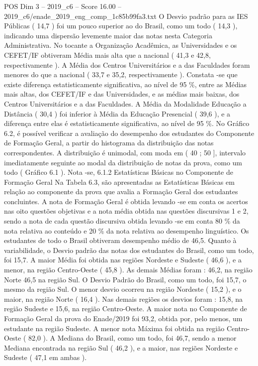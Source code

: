 \begin{textsample}{POS Dim 3 – 2019\_c6 – Score 16.00 – 2019\_c6/enade\_2019\_eng\_comp\_1c85b99fa3.txt}
O Desvio padrão para as IES Públicas ( 14,7 ) foi um pouco superior ao do Brasil, como um todo ( 14,3 ), indicando uma dispersão levemente maior das notas nesta Categoria Administrativa.
No tocante a Organização Acadêmica, as Universidades e os CEFET/IF obtiveram Média mais alta que a nacional ( 41,3 e 42,8, respectivamente ).
A Média dos Centros Universitários e a das Faculdades foram menores do que a nacional ( 33,7 e 35,2, respectivamente ).
Constata -se que existe diferença estatisticamente significativa, ao nível de 95 \%, entre as Médias mais altas, dos CEFET/IF e das Universidades, e as médias mais baixas, dos Centros Universitários e a das Faculdades.
A Média da Modalidade Educação a Distância ( 30,4 ) foi inferior à Média da Educação Presencial ( 39,6 ), e a diferença entre elas é estatisticamente significativa, ao nível de 95 \%.
No Gráfico 6.2, é possível verificar a avaliação do desempenho dos estudantes do Componente de Formação Geral, a partir do histograma da distribuição das notas correspondentes.
A distribuição é unimodal, com moda em ( 40 ; 50 ], intervalo imediatamente seguinte ao modal da distribuição de notas da prova, como um todo ( Gráfico 6.1 ).
Nota -se, 6.1.2 Estatísticas Básicas no Componente de Formação Geral Na Tabela 6.3, são apresentadas as Estatísticas Básicas em relação ao componente da prova que avalia a Formação Geral dos estudantes concluintes.
A nota de Formação Geral é obtida levando -se em conta os acertos nas oito questões objetivas e a nota média obtida nas questões discursivas 1 e 2, sendo a nota de cada questão discursiva obtida levando -se em conta 80 \% da nota relativa ao conteúdo e 20 \% da nota relativa ao desempenho linguístico.
Os estudantes de todo o Brasil obtiveram desempenho médio de 46,5.
Quanto à variabilidade, o Desvio padrão das notas dos estudantes do Brasil, como um todo, foi 15,7.
A maior Média foi obtida nas regiões Nordeste e Sudeste ( 46,6 ), e a menor, na região Centro-Oeste ( 45,8 ).
As demais Médias foram : 46,2, na região Norte 46,5 na região Sul.
O Desvio Padrão do Brasil, como um todo, foi 15,7, o mesmo da região Sul.
O menor desvio ocorreu na região Nordeste ( 15,2 ), e o maior, na região Norte ( 16,4 ).
Nas demais regiões os desvios foram : 15,8, na região Sudeste e 15,6, na região Centro-Oeste.
A maior nota no Componente de Formação Geral da prova do Enade/2019 foi 93,2, obtida por, pelo menos, um estudante na região Sudeste.
A menor nota Máxima foi obtida na região Centro-Oeste ( 82,0 ).
A Mediana do Brasil, como um todo, foi 46,7, sendo a menor Mediana encontrada na região Sul ( 46,2 ), e a maior, nas regiões Nordeste e Sudeste ( 47,1 em ambas ).

\end{textsample}
